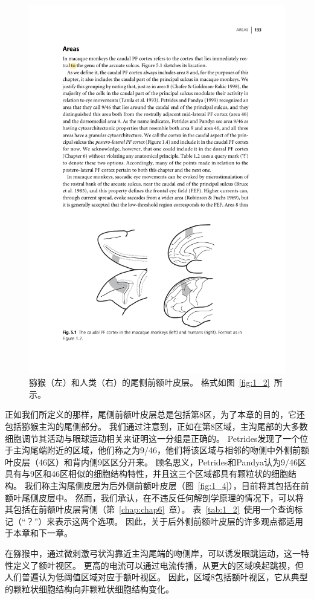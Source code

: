 \begin{figure}
	\centering
	\includegraphics[width=0.7\linewidth]{chap5/Fig_5_1}
	\caption{猕猴（左）和人类（右）的尾侧前额叶皮层。
		格式如图~\ref{fig:1_2}~所示。}
	\label{fig:fig_5_1}
\end{figure}


正如我们所定义的那样，尾侧前额叶皮层总是包括第8区，为了本章的目的，它还包括猕猴主沟的尾侧部分。
我们通过注意到，正如在第8区域\cite{chafee1998matching}，主沟尾部的大多数细胞调节其活动与眼球运动相关\cite{tanila1993regional}来证明这一分组是正确的。
Petrides\cite{petrides1999dorsolateral}发现了一个位于主沟尾端附近的区域，他们称之为9/46，他们将该区域与相邻的吻侧中外侧前额叶皮层（46区）和背内侧9区区分开来。
顾名思义，Petrides和Pandya认为9/46区具有与9区和46区相似的细胞结构特性，并且这三个区域都具有颗粒状的细胞结构。
我们称主沟尾侧皮层为后外侧前额叶皮层（图~\ref{fig:1_4}），目前将其包括在前额叶尾侧皮层中。
然而，我们承认，在不违反任何解剖学原理的情况下，可以将其包括在前额叶皮层背侧（第~\ref{chap:chap6}~章）。
表~\ref{tab:1_2}~使用一个查询标记（“？”）来表示这两个选项。
因此，关于后外侧前额叶皮层的许多观点都适用于本章和下一章。


在猕猴中，通过微刺激弓状沟靠近主沟尾端的吻侧岸，可以诱发眼跳运动\cite{bruce1985primate}，这一特性定义了额叶视区。
更高的电流可以通过电流传播，从更大的区域唤起跳视\cite{robinson1969eye}，但人们普遍认为低阈值区域对应于额叶视区。
因此，区域8包括额叶视区，它从典型的颗粒状细胞结构向非颗粒状细胞结构变化\cite{stanton1989cytoarchitectural}。


